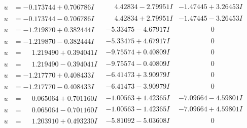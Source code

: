 \documentclass[1p]{elsarticle_modified}
\theoremstyle{definition}
\begin{document}
$$\begin{array}{c|c|c}
\begin{aligned}
u &= -0.173744 + 0.706786 I\end{aligned}
 & \phantom{-}4.42834 - 2.79951 I & -1.47445 + 3.26453 I \\ \hline\begin{aligned}
u &= -0.173744 - 0.706786 I\end{aligned}
 & \phantom{-}4.42834 + 2.79951 I & -1.47445 - 3.26453 I \\ \hline\begin{aligned}
u &= -1.219870 + 0.382444 I\end{aligned}
 & -5.33475 - 4.67917 I & \phantom{-0.000000 } 0 \\ \hline\begin{aligned}
u &= -1.219870 - 0.382444 I\end{aligned}
 & -5.33475 + 4.67917 I & \phantom{-0.000000 } 0 \\ \hline\begin{aligned}
u &= \phantom{-}1.219490 + 0.394041 I\end{aligned}
 & -9.75574 + 0.40809 I & \phantom{-0.000000 } 0 \\ \hline\begin{aligned}
u &= \phantom{-}1.219490 - 0.394041 I\end{aligned}
 & -9.75574 - 0.40809 I & \phantom{-0.000000 } 0 \\ \hline\begin{aligned}
u &= -1.217770 + 0.408433 I\end{aligned}
 & -6.41473 + 3.90979 I & \phantom{-0.000000 } 0 \\ \hline\begin{aligned}
u &= -1.217770 - 0.408433 I\end{aligned}
 & -6.41473 - 3.90979 I & \phantom{-0.000000 } 0 \\ \hline\begin{aligned}
u &= \phantom{-}0.065064 + 0.701160 I\end{aligned}
 & -1.00563 + 1.42365 I & -7.09664 - 4.59801 I \\ \hline\begin{aligned}
u &= \phantom{-}0.065064 - 0.701160 I\end{aligned}
 & -1.00563 - 1.42365 I & -7.09664 + 4.59801 I \\ \hline\begin{aligned}
u &= \phantom{-}1.203910 + 0.493230 I\end{aligned}
 & -5.81092 - 5.03608 I & \phantom{-0.000000 } 0 \\ \hline\begin{aligned}

\end{aligned}
\end{array}$$
\end{document}
